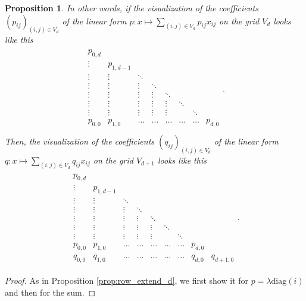 \documentclass[11pt]{article}
\newtheorem{proposition}[theorem]{Proposition}
\begin{document}
\begin{proposition}
  In other words, if the visualization of the coefficients \( (p_{ij})_{(i,j) \in V_d} \) of the linear form \( p: x \mapsto \sum_{(i,j) \in V_d} p_{ij}x_{ij} \) on the grid \( V_d \) looks like this
  \begin{align*}
    \begin{matrix}
      p_{0,d} & & & \\
      \vdots & p_{1,d-1} & & &    \\
      \vdots & \vdots & \ddots & &    \\
      \vdots & \vdots & \vdots & \ddots &    \\
      \vdots & \vdots & \vdots & \vdots & \ddots &  &\\
      \vdots & \vdots & \vdots & \vdots &  \vdots  & \ddots  \\
      \vdots & \vdots & \vdots & \vdots &  \vdots  & & \ddots\\
      p_{0,0} & p_{1,0} & \hdots & \hdots &  \hdots  & \hdots & \hdots & p_{d,0} \\
    \end{matrix}.
  \end{align*}
  Then, the visualization of the coefficients \( (q_{ij})_{(i,j) \in V_d} \) of the linear form \( q: x \mapsto \sum_{(i,j) \in V_d} q_{ij}x_{ij} \) on the grid \( V_{d+1} \) looks like this
  \begin{align*}
    \begin{matrix}
      p_{0,d} & & & \\
      \vdots & p_{1,d-1} &  & &    \\
      \vdots & \vdots & \ddots &  &    \\
      \vdots & \vdots & \vdots & \ddots &     \\
      \vdots & \vdots & \vdots & \vdots & \ddots &  &\\
      \vdots & \vdots & \vdots & \vdots &  \vdots  & \ddots &   \\
      \vdots & \vdots & \vdots & \vdots &  \vdots  & & \ddots &  \\
      p_{0,0} & p_{1,0} & \hdots & \hdots &  \hdots  & \hdots & \hdots & p_{d,0}  \\
      q_{0,0} & q_{1,0} & \hdots & \hdots &  \hdots  & \hdots & \hdots & q_{d,0} & q_{d+1,0}
    \end{matrix}.
  \end{align*}
\end{proposition}

\begin{proof}
  As in Proposition \ref{prop:row_extend_d}, we first show it for \( p = \lambda \mathrm{diag}(i) \) and then for the sum.
\end{proof}
\end{document}
